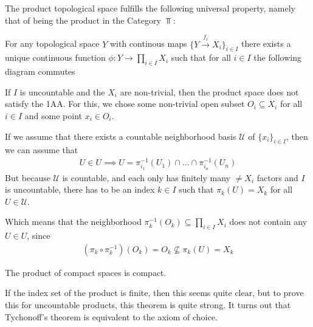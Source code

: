 The product topological space fulfills the following universal property, namely that of being the product in the Category $\Top$:

For any topological space $Y$ with continous maps $\{Y \stackrel{f_i}{\to}X_i\}_{i \in I}$ there exists a unique continuous function $\phi: Y \to  \prod_{i \in I}X_i$ such that for all $i \in I$ the following diagram commutes

\begin{center}
\end{center}


\begin{ex}[]
If $I$ is uncountable and the $X_i$ are non-trivial, then the product space does not satisfy the 1AA.
For this, we chose some non-trivial open subset $O_i \subseteq X_i$ for all $i \in I$ and some point $x_i \in O_i$.

If we assume that there exists a countable neighborhood basis $\mathcal{U}$ of $\{x_i\}_{i \in I}$, then we can assume that
\begin{align*}
  U \in U \implies U = \pi_{i_1}^{-1}(U_1) \cap \ldots \cap \pi_{i_n}^{-1}(U_n)
\end{align*}
But because $\mathcal{U}$ is countable, and each only has finitely many $\neq X_i$ factors and $I$ is uncountable,
there has to be an index $k \in I$ such that $\pi_k(U) = X_k$ for all $U \in \mathcal{U}$.

Which means that the neighborhood $\pi_k^{-1}(O_k) \subseteq \prod_{i \in I}X_i$ does not contain any $U \in U$, since
\begin{align*}
  (\pi_k \circ \pi_k^{-1})(O_k) = O_k \nsubseteq \pi_k(U) = X_k
\end{align*}
\end{ex}
\begin{thm}[Tychonoff]
The product of compact spaces is compact.
\end{thm}
If the index set of the product is finite, then this seems quite clear, but to prove this for uncountable products, this theorem is quite strong.
It turns out that Tychonoff's theorem is equivalent to the axiom of choice.

